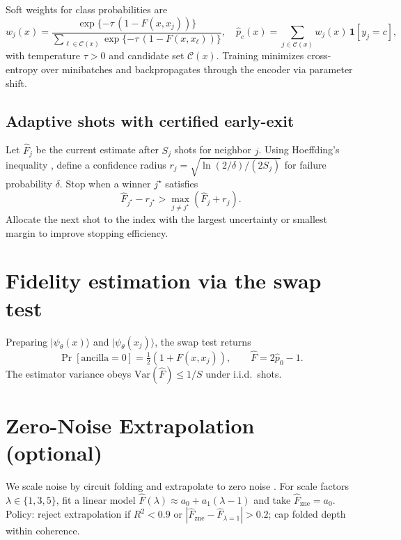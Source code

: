 \documentclass[11pt]{article}
\begin{document}
Soft weights for class probabilities are
\begin{equation}
w_j(x)=\frac{\exp\{-\tau\,(1-F(x,x_j))\}}{\sum_{\ell\in\mathcal{C}(x)} \exp\{-\tau\,(1-F(x,x_\ell))\}},\quad
\hat p_c(x)=\sum_{j\in\mathcal{C}(x)} w_j(x)\,\mathbf{1}[y_j=c],
\end{equation}
with temperature $\tau>0$ and candidate set $\mathcal{C}(x)$. Training minimizes cross-entropy over minibatches and backpropagates through the encoder via parameter shift.

\subsection{Adaptive shots with certified early-exit}
Let $\hat F_j$ be the current estimate after $S_j$ shots for neighbor $j$. Using Hoeffding's inequality \citep{Hoeffding1963}, define a confidence radius $r_j=\sqrt{\ln(2/\delta)/(2S_j)}$ for failure probability $\delta$. Stop when a winner $j^\star$ satisfies
\begin{equation}
\hat F_{j^\star}-r_{j^\star} > \max_{j\neq j^\star} (\hat F_j + r_j).
\end{equation}
Allocate the next shot to the index with the largest uncertainty or smallest margin to improve stopping efficiency.

\section{Fidelity estimation via the swap test}
Preparing $|\psi_\theta(x)\rangle$ and $|\psi_\theta(x_j)\rangle$, the swap test returns
\begin{equation}
\Pr[\text{ancilla}=0] = \tfrac{1}{2}\left(1 + F(x,x_j)\right),\qquad \hat F=2\hat p_0-1.
\end{equation}
The estimator variance obeys $\mathrm{Var}(\hat F)\le 1/S$ under i.i.d.\ shots.

\section{Zero-Noise Extrapolation (optional)}
We scale noise by circuit folding and extrapolate to zero noise \citep{Temme2017,He2020,GiurgicaTiron2020}. For scale factors $\lambda\in\{1,3,5\}$, fit a linear model $\hat F(\lambda)\approx a_0 + a_1(\lambda-1)$ and take $\hat F_{\mathrm{zne}}=a_0$. Policy: reject extrapolation if $R^2<0.9$ or $|\hat F_{\mathrm{zne}}-\hat F_{\lambda=1}|>0.2$; cap folded depth within coherence.
\end{document}
